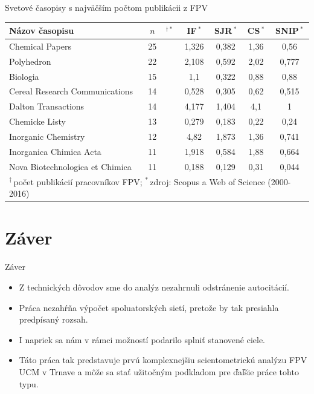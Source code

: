 \documentclass{beamer}
\begin{document}
%
%
\begin{frame}{Svetové časopisy s najväčším počtom publikácii z FPV}
  \begin{table}
    \footnotesize
    \begin{tabular}{lc@{}lcccc}
      \toprule
      Názov časopisu & $n$&$^{\dagger\ast}$ & IF\,$^\ast$ & SJR\,$^\ast$  & CS\,$^\ast$ & SNIP\,$^\ast$ \\
      \midrule
      Chemical Papers                 & 25& & 1,326           & 0,382 & 1,36           & 0,56\phantom{0} \\
      Polyhedron                      & 22& & 2,108           & 0,592 & 2,02           & 0,777           \\
      Biologia                        & 15& & 1,1\phantom{00} & 0,322 & 0,88           & 0,88\phantom{0} \\
      Cereal Research Communications  & 14& & 0,528           & 0,305 & 0,62           & 0,515           \\
      Dalton Transactions             & 14& & 4,177           & 1,404 & 4,1\phantom{0} & 1\phantom{,000} \\[1ex]
      Chemicke Listy                  & 13& & 0,279           & 0,183 & 0,22           & 0,24\phantom{0} \\
      Inorganic Chemistry             & 12& & 4,82\phantom{0} & 1,873 & 1,36           & 0,741           \\
      Inorganica Chimica Acta         & 11& & 1,918           & 0,584 & 1,88           & 0,664           \\
      Nova Biotechnologica et Chimica & 11& & 0,188           & 0,129 & 0,31           & 0,044           \\
      \bottomrule
      \multicolumn{7}{l}{\tiny $^\dagger$\,počet publikácií pracovníkov FPV; $^\ast$\,zdroj: Scopus a Web of Science (2000-2016)} \\
    \end{tabular}
  \end{table}
\end{frame}


\section{Záver}

\begin{frame}{Záver}
  \begin{itemize}
  \item<1-> Z technických dôvodov sme do analýz nezahrnuli odstránenie
    autocitácií.
  \item<2-> Práca nezahŕňa výpočet spoluatorských sietí, pretože by tak
    presiahla predpísaný rozsah.
  \item<3-> I napriek sa nám v rámci možností podarilo splniť stanovené ciele.
  \item<4-> Táto práca tak predstavuje prvú komplexnejšiu scientometrickú
    analýzu FPV UCM v Trnave a môže sa stať užitočným podkladom pre ďaľšie práce
    tohto typu.
  \end{itemize}
\end{frame}
\end{document}
